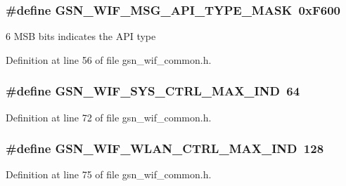 \hypertarget{a00608_ac20a0c502121937beaabf53f00fd3776}{
\subsubsection[{GSN\_\-WIF\_\-MSG\_\-API\_\-TYPE\_\-MASK}]{\setlength{\rightskip}{0pt plus 5cm}\#define GSN\_\-WIF\_\-MSG\_\-API\_\-TYPE\_\-MASK~0xF600}}
\label{a00608_ac20a0c502121937beaabf53f00fd3776}
6 MSB bits indicates the API type 

Definition at line 56 of file gsn\_\-wif\_\-common.h.

\hypertarget{a00608_abe13302e016e67142230d1bf7bdb48cf}{
\subsubsection[{GSN\_\-WIF\_\-SYS\_\-CTRL\_\-MAX\_\-IND}]{\setlength{\rightskip}{0pt plus 5cm}\#define GSN\_\-WIF\_\-SYS\_\-CTRL\_\-MAX\_\-IND~64}}
\label{a00608_abe13302e016e67142230d1bf7bdb48cf}


Definition at line 72 of file gsn\_\-wif\_\-common.h.

\hypertarget{a00608_a692ce45c7b1608292f5ca78251f12d85}{
\subsubsection[{GSN\_\-WIF\_\-WLAN\_\-CTRL\_\-MAX\_\-IND}]{\setlength{\rightskip}{0pt plus 5cm}\#define GSN\_\-WIF\_\-WLAN\_\-CTRL\_\-MAX\_\-IND~128}}
\label{a00608_a692ce45c7b1608292f5ca78251f12d85}


Definition at line 75 of file gsn\_\-wif\_\-common.h.



